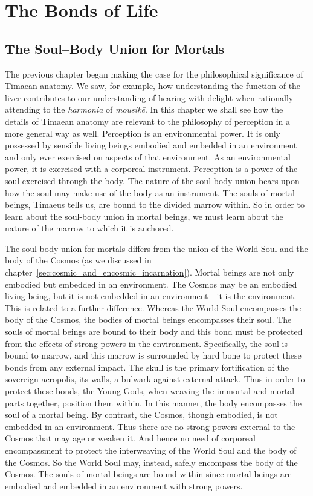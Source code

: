 
\chapter{The Bonds of Life} %
\label{cha:the_bonds_of_life}

\section{The Soul--Body Union for Mortals} %
\label{sec:the_soul_body_union_in_mortals}

The previous chapter began making the case for the philosophical significance of Timae\-an anatomy. We saw, for example, how understanding the function of the liver contributes to our understanding of hearing with delight when rationally attending to the \emph{harmonia} of \emph{mousikē}. In this chapter we shall see how the details of Timaean anatomy are relevant to the philosophy of perception in a more general way as well. Perception is an environmental power. It is only possessed by sensible living beings embodied and embedded in an environment and only ever exercised on aspects of that environment. As an environmental power, it is exercised with a corporeal instrument. Perception is a power of the soul exercised through the body. The nature of the soul-body union bears upon how the soul may make use of the body as an instrument. The souls of mortal beings, Timaeus tells us, are bound to the divided marrow within. So in order to learn about the soul-body union in mortal beings, we must learn about the nature of the marrow to which it is anchored.

The soul-body union for mortals differs from the union of the World Soul and the body of the Cosmos (as we discussed in chapter~\ref{sec:cosmic_and_encosmic_incarnation}). Mortal beings are not only embodied but embedded in an environment. The Cosmos may be an embodied living being, but it is not embedded in an environment---it is the environment. This is related to a further difference. Whereas the World Soul encompasses the body of the Cosmos, the bodies of mortal beings encompasses their soul. The souls of mortal beings are bound to their body and this bond must be protected from the effects of strong powers in the environment. Specifically, the soul is bound to marrow, and this marrow is surrounded by hard bone to protect these bonds from any external impact. The skull is the primary fortification of the sovereign acropolis, its walls, a bulwark against external attack. Thus in order to protect these bonds, the Young Gods, when weaving the immortal and mortal parts together, position them within. In this manner, the body encompasses the soul of a mortal being. By contrast, the Cosmos, though embodied, is not embedded in an environment. Thus there are no strong powers external to the Cosmos that may age or weaken it. And hence no need of corporeal encompassment to protect the interweaving of the World Soul and the body of the Cosmos. So the World Soul may, instead, safely encompass the body of the Cosmos. The souls of mortal beings are bound within since mortal beings are embodied and embedded in an environment with strong powers.

